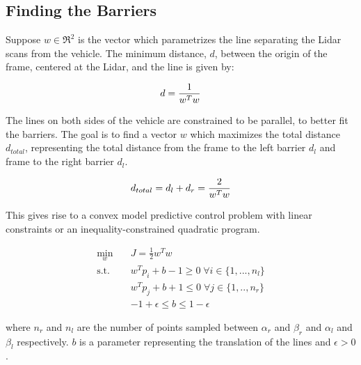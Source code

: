 \documentclass[conference]{IEEEtran}
\begin{document}

\subsection{Finding the Barriers}
Suppose $w \in \Re^2$  is the vector which parametrizes the line separating the Lidar scans from the vehicle. The minimum distance, $d$, between the origin of the frame, centered at the Lidar, and the line is given by:

\begin{align}
    d = \frac{1}{w^T w} \notag
\end{align}

The lines on both sides of the vehicle are constrained to be parallel, to better fit the barriers. The goal is to find a vector $w$ which maximizes the total distance $d_{total}$, representing the total distance from the frame to the left barrier $d_l$ and frame to the right barrier $d_l$. 

\begin{align}
    d_{total} = d_l + d_r = \frac{2}{w^T w} \notag
\end{align}


This gives rise to a convex model predictive control problem with linear constraints or an inequality-constrained quadratic program.  

\begin{equation}
\begin{aligned}
        \min_{w}  \quad & J = \frac{1}{2}w^T w \\
        \text{s.t.} \quad & w^Tp_i + b - 1 \geq 0  \; \forall i \in \{1,...,n_l\} \\
        & w^Tp_j + b + 1 \leq 0 \; \forall j \in \{1,..,n_r\}\\ 
        & -1+\epsilon \leq b \leq 1 - \epsilon
\end{aligned}
\end{equation}


where $n_r$ and $n_l$ are the number of points sampled between $\alpha_r$ and $\beta_r$ and $\alpha_l$ and $\beta_l$ respectively. $b$ is a parameter representing the translation of the lines and $\epsilon > 0$.
\end{document}
